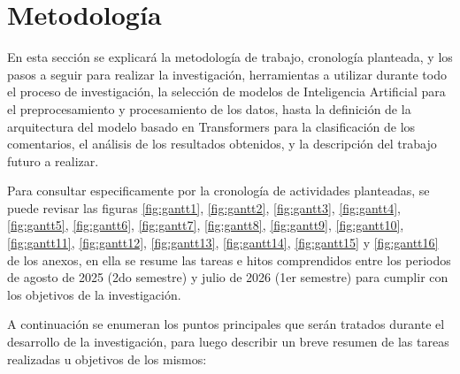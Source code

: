 \chapter{Metodología}
\label{cha:Metodología}

En esta sección se explicará la metodología de trabajo, cronología planteada, y los pasos a seguir para realizar la investigación, herramientas a utilizar durante todo el proceso de investigación, la selección de modelos de Inteligencia Artificial para el preprocesamiento y procesamiento de los datos, hasta la definición de la arquitectura del modelo basado en Transformers para la clasificación de los comentarios, el análisis de los resultados obtenidos, y la descripción del trabajo futuro a realizar.

Para consultar especificamente por la cronología de actividades planteadas, se puede revisar las figuras \ref{fig:gantt1}, \ref{fig:gantt2}, \ref{fig:gantt3}, \ref{fig:gantt4}, \ref{fig:gantt5}, \ref{fig:gantt6}, \ref{fig:gantt7}, \ref{fig:gantt8}, \ref{fig:gantt9}, \ref{fig:gantt10}, \ref{fig:gantt11}, \ref{fig:gantt12}, \ref{fig:gantt13}, \ref{fig:gantt14}, \ref{fig:gantt15} y \ref{fig:gantt16} de los anexos, en ella se resume las tareas e hitos comprendidos entre los periodos de agosto de 2025 (2do semestre) y julio de 2026 (1er semestre) para cumplir con los objetivos de la investigación.

A continuación se enumeran los puntos principales que serán tratados durante el desarrollo de la investigación, para luego describir un breve resumen de las tareas realizadas u objetivos de los mismos:

